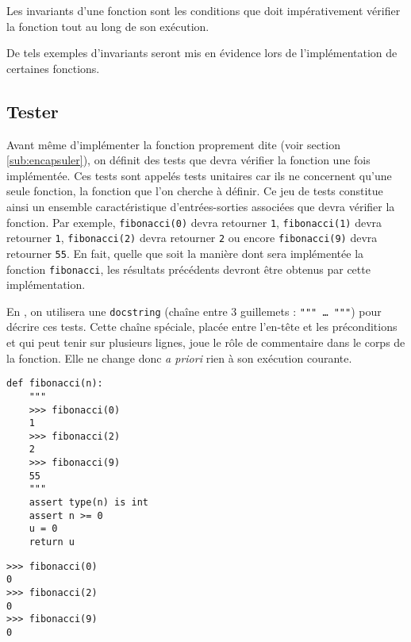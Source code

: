 \begin{defin}
Les invariants d'une fonction sont les conditions que doit 
impérativement vérifier la fonction tout au long de son exécution.
\end{defin}

\noindent De tels exemples d'invariants seront mis en évidence 
lors de l'implémentation de certaines fonctions.


\subsection{Tester}
Avant même d'implémenter la fonction proprement dite (voir section 
\ref{sub:encapsuler}), on définit des tests que devra vérifier la 
fonction une fois implémentée. Ces tests sont appelés tests unitaires
car ils ne concernent qu'une seule fonction, la fonction que l'on cherche
à définir.
Ce jeu de tests constitue ainsi un ensemble caractéristique d'entrées-sorties associées
que devra vérifier la fonction. 
Par exemple,
{\tt fibonacci(0)} devra retourner {\tt 1}, {\tt fibonacci(1)} devra retourner {\tt 1}, 
{\tt fibonacci(2)} devra retourner {\tt 2} ou encore {\tt fibonacci(9)} devra retourner {\tt 55}.
En fait, quelle que soit la manière dont sera implémentée la fonction {\tt fibonacci},
les résultats précédents devront être obtenus par cette implémentation.

En \python, on utilisera une {\tt docstring} (chaîne entre 3 guillemets : {\tt """ \ldots\ """}) pour
décrire ces tests.
Cette chaîne spéciale, placée entre l'en-tête et les préconditions et qui peut tenir
sur plusieurs lignes, joue le rôle de commentaire dans le corps de la fonction.
Elle ne change donc {\em a priori} rien à son exécution courante. 

\noindent\mbox{}\hspace*{1cm}\begin{py}{6cm}
\begin{verbatim}
def fibonacci(n):
    """
    >>> fibonacci(0)
    1
    >>> fibonacci(2)
    2
    >>> fibonacci(9)
    55
    """
    assert type(n) is int
    assert n >= 0
    u = 0
    return u
\end{verbatim}
\end{py}\hfill
\begin{py}{6cm}
\begin{verbatim}
>>> fibonacci(0)
0
>>> fibonacci(2)
0
>>> fibonacci(9)
0
\end{verbatim}
\end{py}
\hspace*{1cm}\mbox{}\vspace*{2mm}

